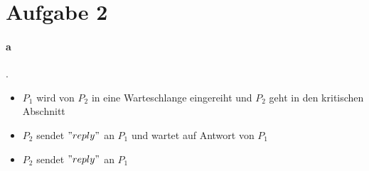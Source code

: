 \documentclass{scrartcl}
\begin{document}
		
		
		\section*{Aufgabe 2}
			\paragraph*{a}.
				\begin{itemize}
					\item $P_1$ wird von $P_2$ in eine Warteschlange eingereiht und $P_2$ geht in den kritischen Abschnitt
					\item $P_2$ sendet $"reply"$ an $P_1$ und wartet auf Antwort von $P_1$
					\item $P_2$ sendet $"reply"$ an $P_1$
				\end{itemize}
	
\end{document}
